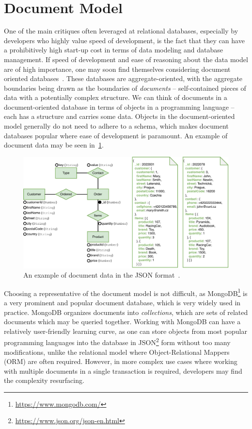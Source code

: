 \section{Document Model}

One of the main critiques often leveraged at relational databases, especially by developers who highly value speed of development, is the fact that they can have a prohibitively high start-up cost in terms of data modeling and database management.
If speed of development and ease of reasoning about the data model are of high importance, one may soon find themselves considering document oriented databases~\cite{document_dbs}.
These databases are aggregate-oriented, with the aggregate boundaries being drawn as the boundaries of \textit{documents} -- self-contained pieces of data with a potentially complex structure.
We can think of documents in a document-oriented database in terms of objects in a programming language -- each has a structure and carries some data.
Objects in the document-oriented model generally do not need to adhere to a schema, which makes document databases popular where ease of development is paramount.
An example of document data may be seen in~\cref{fig:documentdata}.

\begin{figure}[ht]
\centering
\includegraphics[scale=0.66]{img/example-json.pdf}
\caption{An example of document data in the JSON format~\cite{inference}.}
\label{fig:documentdata}
\end{figure}

Choosing a representative of the document model is not difficult, as MongoDB\footnote{\url{https://www.mongodb.com/}} is a very prominent and popular document database, which is very widely used in practice.
MongoDB organizes documents into \textit{collections}, which are sets of related documents which may be queried together.
Working with MongoDB can have a relatively user-friendly learning curve, as one can store objects from most popular programming languages into the database in JSON\footnote{\url{https://www.json.org/json-en.html}} form without too many modifications, unlike the relational model where Object-Relational Mappers (ORM) are often required.
However, in more complex use cases where working with multiple documents in a single transaction is required, developers may find the complexity resurfacing.

